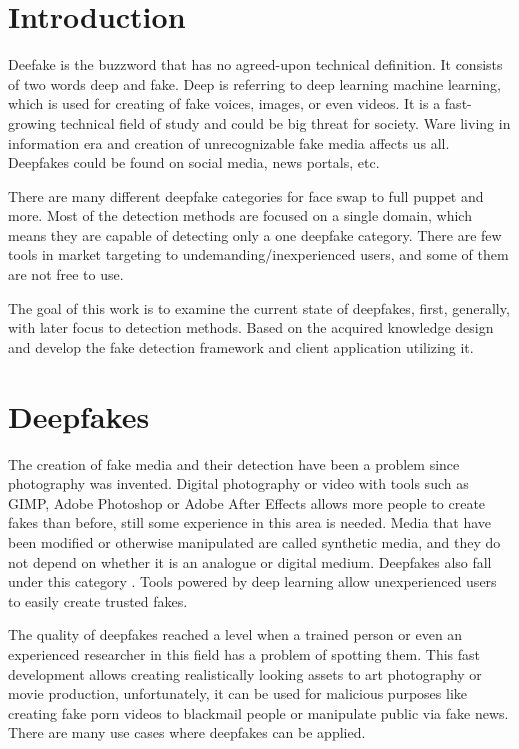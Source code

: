 \chapter{Introduction}

Deefake is the buzzword that has no agreed-upon technical definition. It consists of two words deep and fake. Deep is referring to deep learning machine learning, which is used for creating of fake voices, images, or even videos. It is a fast-growing technical field of study and could be big threat for society. Ware living in information era and creation of unrecognizable fake media affects us all. Deepfakes could be found on social media, news portals, etc.

There are many different deepfake categories for face swap to full puppet and more. Most of the detection methods are focused on a single domain, which means they are capable of detecting only a one deepfake category. There are few tools in market targeting to undemanding/inexperienced users, and some of them are not free to use.

The goal of this work is to examine the current state of deepfakes, first, generally, with later focus to detection methods. Based on the acquired knowledge design and develop the fake detection framework and client application utilizing it.

\chapter{Deepfakes}

The creation of fake media and their detection have been a problem since photography was invented. Digital photography or video with tools such as GIMP, Adobe Photoshop or Adobe After Effects allows more people to create fakes than before, still some experience in this area is needed. Media that have been modified or otherwise manipulated are called synthetic media, and they do not depend on whether it is an analogue or digital medium. Deepfakes also fall under this category \cite{IncreasingThreatofDeepfakeIdentites}. Tools powered by deep learning allow unexperienced users to easily create trusted fakes. 

The quality of deepfakes reached a level when a trained person or even an experienced researcher in this field has a problem of spotting them. This fast development allows creating realistically looking assets to art photography or movie production, unfortunately, it can be used for malicious purposes like creating fake porn videos to blackmail people or manipulate public via fake news. There are many use cases where deepfakes can be applied.

